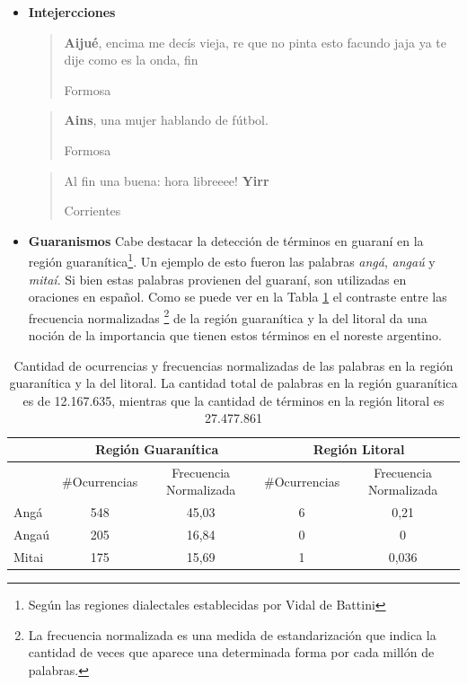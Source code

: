 \begin{itemize}
\item \textbf{Intejercciones}

  \blockquote[Formosa]{\textbf{Aijué}, encima me decís vieja, re que no pinta esto facundo jaja ya te dije como es la onda, fin }

  \blockquote[Formosa]{\textbf{Ains}, una mujer hablando de fútbol.}

  \blockquote[Corrientes]{Al fin una buena: hora libreeee! \textbf{Yirr} }

\item \textbf{Guaranismos}
\label{sub:guaranismos}
Cabe destacar la detección de términos en guaraní en la región  guaranítica\footnote{Según las regiones dialectales establecidas por Vidal de Battini\cite{vidal1964espanol}}.
Un ejemplo de esto fueron las palabras \textit{angá}, \textit{angaú} y \textit{mitaí}.  Si bien estas palabras provienen del guaraní, son utilizadas en oraciones en español.
Como se puede ver en la Tabla \ref{tab:guaranismos} el contraste entre las frecuencia normalizadas \footnote{La frecuencia normalizada es una medida de estandarización que indica la cantidad de veces que aparece una determinada forma por cada millón de palabras.} de la región guaranítica y la del litoral da una noción de la importancia que tienen estos términos en el noreste argentino. 

\end{itemize}


\begin{table}
\centering

\begin{tabular}{|l|cc|cc|}
\hline
 & \multicolumn{2}{c}{Región Guaranítica} & \multicolumn{2}{c}{Región Litoral} \\ \hline
      & \#Ocurrencias & Frecuencia Normalizada & \#Ocurrencias & Frecuencia Normalizada \\
Angá  & 548              & 45,03       & 6             & 0,21                  \\
Angaú & 205               & 16,84   & 0               & 0                     \\
Mitai & 175              & 15,69      & 1              & 0,036    \\ \hline              
\end{tabular}

\caption{Cantidad de ocurrencias y frecuencias normalizadas de las palabras en la región guaranítica y la del litoral. La cantidad total de palabras en la región guaranítica es de 12.167.635, mientras que la cantidad de términos en la región litoral es 27.477.861 }
\label{tab:guaranismos}
\end{table}

